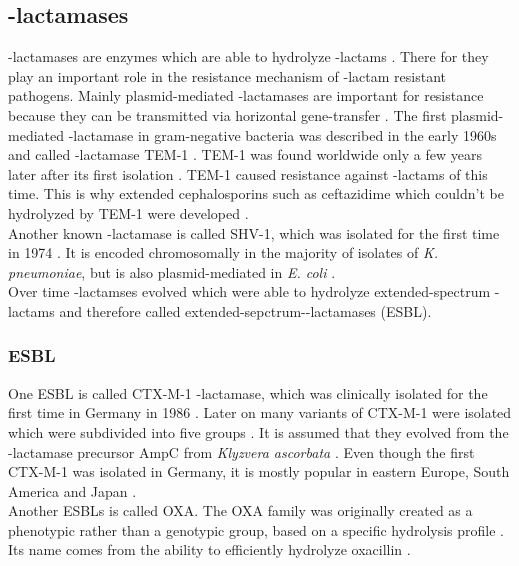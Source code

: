 \subsection{\textbeta-lactamases}
\label{section:resistance_mechanisms}
\textbeta-lactamases are enzymes which are able to hydrolyze \textbeta-lactams \cite{fisher_bacterial_2005}. There for they play an important role in the resistance mechanism of \textbeta-lactam resistant pathogens. 
Mainly plasmid-mediated \textbeta-lactamases are important for resistance because they can be transmitted via horizontal gene-transfer \cite{munita_mechanisms_2016}.  
The first plasmid-mediated \textbeta-lactamase in gram-negative bacteria was described in the early 1960s and called \textbeta-lactamase TEM-1  \cite{fernandes_-lactams:_2013}. TEM-1 was found worldwide only a few years later after its first isolation \cite{fernandes_-lactams:_2013}. TEM-1 caused resistance against \textbeta-lactams of this time.  This is why extended cephalosporins such as ceftazidime which couldn't be hydrolyzed by TEM-1 were developed \cite{fernandes_-lactams:_2013}. \\
Another known \textbeta-lactamase is called SHV-1, which was isolated for the first time in 1974 \cite{kuzin_structure_1999}. It is encoded chromosomally in the majority of isolates of \textit{K. pneumoniae}, but is also plasmid-mediated in \textit{E. coli} \cite{kuzin_structure_1999}. \\
Over time \textbeta-lactamses evolved which were able to hydrolyze extended-spectrum \textbeta-lactams and therefore called extended-sepctrum-\textbeta-lactamases (ESBL).  

\subsubsection{ESBL}
One ESBL is called CTX-M-1 \textbeta-lactamase, which was clinically isolated for the first time in Germany in 1986 \cite{bradford_extended-spectrum_2001}. Later on many variants of CTX-M-1 were isolated which were subdivided into five groups \cite{fernandes_-lactams:_2013}.
It is assumed that they evolved from the \textbeta-lactamase precursor AmpC from \textit{Klyzvera ascorbata}  \cite{bradford_extended-spectrum_2001}. Even though the first CTX-M-1 was isolated in Germany, it is mostly popular in eastern Europe, South America and Japan \cite{bradford_extended-spectrum_2001}. \\
Another ESBLs is called OXA.
The OXA family was originally created as a phenotypic rather than a genotypic group, based on a specific hydrolysis profile \cite{bradford_extended-spectrum_2001}. Its name comes from the ability to efficiently hydrolyze oxacillin \cite{bradford_extended-spectrum_2001}. \\

